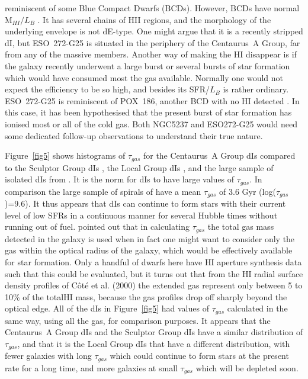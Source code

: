 \documentclass[preprint]{aastex}
\begin{document}
reminiscent of some Blue Compact Dwarfs (BCDs). However, BCDs have normal 
M$_{HI}/L_B$ \citet{hkp05}. It has several chains of HII regions,
and the morphology of the underlying envelope is not dE-type. One might
argue that it is a recently stripped dI, but ESO~272-G25 is situated in
the periphery of the Centaurus~A Group, far from any of the massive members. 
Another way of making the HI disappear is if the galaxy recently underwent 
a large burst or several bursts of star formation which would have consumed 
most the gas available. Normally one would not expect the efficiency to be so high,
and besides its SFR/$L_B$ is rather ordinary. ESO~272-G25 is reminiscent of
POX~186, another BCD with no HI detected \citep{bc05}.  In this case, it
has been hypothesised that the present burst of star formation has ionised
most or all of the cold gas.  Both NGC5237 and ESO272-G25 would need
some dedicated follow-up observations to understand their true nature.

Figure~\ref{fig5} shows histograms of $\tau _{gas}$ for the Centaurus~A Group
dIs compared to the Sculptor Group dIs \citep{scm03a}, the Local 
Group dIs \citep{m98}, and the large sample of isolated dIs from \citet{vz01}.
It is the norm for dIs to have large values of $\tau _{gas}$. In comparison 
the large sample of spirals of \citet{ktc94} have a mean $\tau _{gas}$ of
3.6 Gyr (log($\tau _{gas}$)=9.6). It thus appears that dIs can continue
to form stars with their current level of low SFRs in a
continuous manner for several Hubble times without running out of fuel.
\citet{ktc94} pointed out that in calculating $\tau _{gas}$ the total gas mass detected
in the galaxy is used when in fact one might want to consider only
the gas within the optical radius of the galaxy, which would be effectively
available for star formation. Only a handful of dwarfs here have HI aperture synthesis 
data such that this could be evaluated, but it turns out that from the HI  
radial surface density profiles of C\^ot\'e et al. (2000) the extended gas represent 
only between 5 to 10\% of the totalHI mass, because the gas profiles drop off sharply
beyond the optical edge. 
All of the dIs in Figure~\ref{fig5} had 
values of $\tau _{gas}$ calculated in the same way, using all the gas, for comparison 
purposes. It appears that the Centaurus~A Group dIs and the Sculptor Group dIs have a
similar distribution of $\tau _{gas}$, and that it is the Local Group dIs
that have a different distribution, with fewer galaxies with long $\tau _{gas}$
which could continue to form stars at the present rate for a long time, 
and more galaxies at small $\tau _{gas}$ which will be depleted soon.
\end{document}
